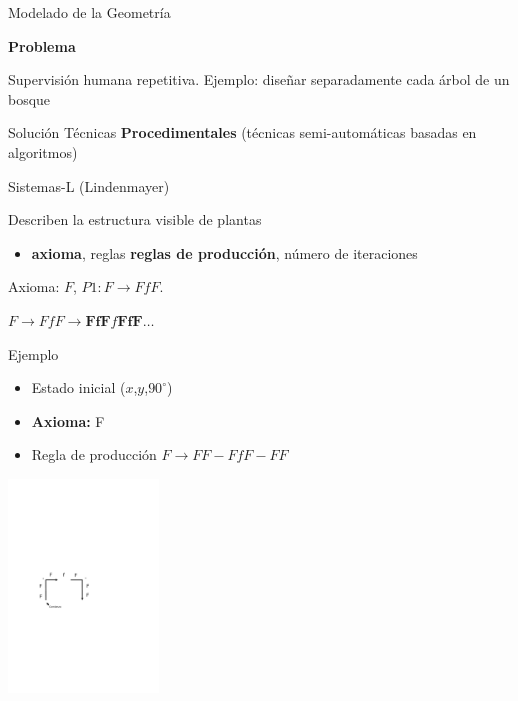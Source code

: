 \documentclass[spanish,unknownkeysallowed]{beamer}
\begin{document}
\begin{frame}{Modelado de la Geometría}

\textbf{Problema}

Supervisión humana repetitiva. Ejemplo: diseñar separadamente cada árbol de un bosque

\begin{block}{Solución}
Técnicas \textbf{Procedimentales} (técnicas semi-automáticas basadas en algoritmos)
\end{block}

\begin{block}{Sistemas-L (Lindenmayer)}

Describen la estructura visible de plantas


\begin{itemize}
\item \textbf{axioma}, reglas \textbf{reglas de producción}, número de iteraciones
\end{itemize}
\end{block}


Axioma: $F$, $P1: F \rightarrow FfF$.

$F \rightarrow FfF \rightarrow \textbf{FfF}f\textbf{FfF} \ldots$

\end{frame}

\begin{frame}{Ejemplo}
\begin{itemize}
\item Estado inicial ($x$,$y$,$90^{\circ}$)
\item \textbf{Axioma:} F
\item Regla de producción $F \rightarrow FF-FfF-FF$
\end{itemize}


\center
\includegraphics[width=4cm]{../figures/tortuga}

\end{frame}
\end{document}
